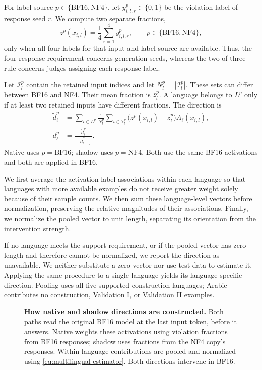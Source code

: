 For label source $p\in\{\mathrm{BF16},\mathrm{NF4}\}$, let
$y^p_{i,l,r}\in\{0,1\}$ be the violation label of response seed $r$.
We compute two separate fractions,
\begin{equation}
 z^p(x_{i,l})=\frac{1}{4}\sum_{r=1}^{4}y^p_{i,l,r},
 \qquad p\in\{\mathrm{BF16},\mathrm{NF4}\},
 \label{eq:construction-fractions}
\end{equation}
only when all four labels for that input and label source are available.
Thus, the four-response requirement concerns generation seeds, whereas
the two-of-three rule concerns judges assigning each response label.

Let $\mathcal I_l^p$ contain the retained input indices and let
$N_l^p=|\mathcal I_l^p|$. These sets can differ between BF16 and NF4.
Their mean fraction is $\bar z_l^p$. A language belongs to $L^p$ only
if at least two retained inputs have different fractions. The direction is
\begin{equation}
 \begin{aligned}
 \tilde d_\ell^p
 &=\sum_{l\in L^p}\frac{1}{N_l^p}
   \sum_{i\in\mathcal I_l^p}
   \bigl(z^p(x_{i,l})-\bar z_l^p\bigr)A_\ell(x_{i,l}),\\
 d_\ell^p&=\frac{\tilde d_\ell^p}{\|\tilde d_\ell^p\|_2}.
 \end{aligned}
 \label{eq:multilingual-estimator}
\end{equation}
Native uses $p=\mathrm{BF16}$; shadow uses $p=\mathrm{NF4}$. Both use
the same BF16 activations and both are applied in BF16.

We first average the activation-label associations within each language so that languages with more available examples do not receive greater weight solely because of their sample counts. We then sum these language-level vectors before normalization, preserving the relative magnitudes of their associations. Finally, we normalize the pooled vector to unit length, separating its orientation from the intervention
strength.

If no language meets the support requirement, or if the pooled vector has zero length and therefore cannot be normalized, we report the direction as unavailable. We neither substitute a zero vector nor use test data to estimate it. Applying the same procedure to a single language yields its language-specific direction. Pooling uses all five supported construction languages; Arabic contributes no construction, Validation I, or Validation II examples.

\begin{figure}[t]
  \centering
  \resizebox{.85\linewidth}{!}{}
  \caption{\textbf{How native and shadow directions are constructed.}
  Both paths read the original BF16 model at the last input token, before
  it answers. Native weights these activations using violation fractions
  from BF16 responses; shadow uses fractions from the NF4 copy's responses.
  Within-language contributions are pooled and normalized using
  \cref{eq:multilingual-estimator}. Both directions intervene in BF16.}
  \label{fig:shadow-pipeline}
\end{figure}

